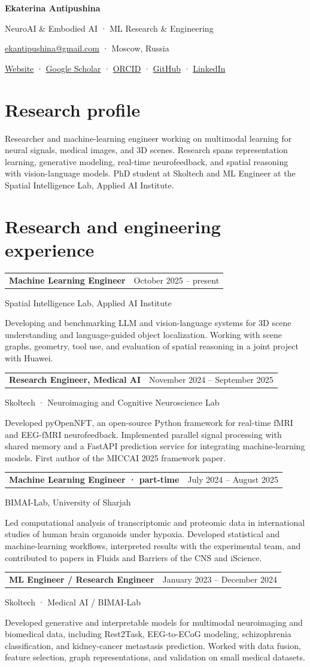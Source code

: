 \documentclass[10pt,a4paper]{article}
\makeatletter
\newcommand{\entry}[3]{\vspace{4pt}\begin{tabularx}{\textwidth}{@{}>{\raggedright\arraybackslash}X r@{}}\textbf{#1}&{\small\color{muted}#2}\\\end{tabularx}\par{\small\color{muted}#3}\par\vspace{2pt}}
\makeatother
\begin{document}
\fontsize{10.5}{12.6}\selectfont
{\fontsize{25}{29}\selectfont\bfseries Ekaterina Antipushina}\par\vspace{4pt}
{\large\color{accent}NeuroAI \& Embodied AI · ML Research \& Engineering}\par\vspace{6pt}
\href{mailto:ekantipushina@gmail.com}{ekantipushina@gmail.com} · Moscow, Russia\par
\href{https://utoprey.github.io/}{Website} · \href{https://scholar.google.com/citations?user=7VOBHhMAAAAJ}{Google Scholar} · \href{https://orcid.org/0009-0009-9708-440X}{ORCID} · \href{https://github.com/utoprey}{GitHub} · \href{https://www.linkedin.com/in/katherine-antipushina/}{LinkedIn}\par
\section{Research profile}
Researcher and machine-learning engineer working on multimodal learning for neural signals, medical images, and 3D scenes. Research spans representation learning, generative modeling, real-time neurofeedback, and spatial reasoning with vision-language models. PhD student at Skoltech and ML Engineer at the Spatial Intelligence Lab, Applied AI Institute.
\section{Research and engineering experience}
\entry{Machine Learning Engineer}{October 2025 – present}{Spatial Intelligence Lab, Applied AI Institute}
Developing and benchmarking LLM and vision-language systems for 3D scene understanding and language-guided object localization. Working with scene graphs, geometry, tool use, and evaluation of spatial reasoning in a joint project with Huawei.\par
\entry{Research Engineer, Medical AI}{November 2024 – September 2025}{Skoltech · Neuroimaging and Cognitive Neuroscience Lab}
Developed pyOpenNFT, an open-source Python framework for real-time fMRI and EEG-fMRI neurofeedback. Implemented parallel signal processing with shared memory and a FastAPI prediction service for integrating machine-learning models. First author of the MICCAI 2025 framework paper.\par
\entry{Machine Learning Engineer · part-time}{July 2024 – August 2025}{BIMAI-Lab, University of Sharjah}
Led computational analysis of transcriptomic and proteomic data in international studies of human brain organoids under hypoxia. Developed statistical and machine-learning workflows, interpreted results with the experimental team, and contributed to papers in Fluids and Barriers of the CNS and iScience.\par
\entry{ML Engineer / Research Engineer}{January 2023 – December 2024}{Skoltech · Medical AI / BIMAI-Lab}
Developed generative and interpretable models for multimodal neuroimaging and biomedical data, including Rest2Task, EEG-to-ECoG modeling, schizophrenia classification, and kidney-cancer metastasis prediction. Worked with data fusion, feature selection, graph representations, and validation on small medical datasets.\par
\end{document}
